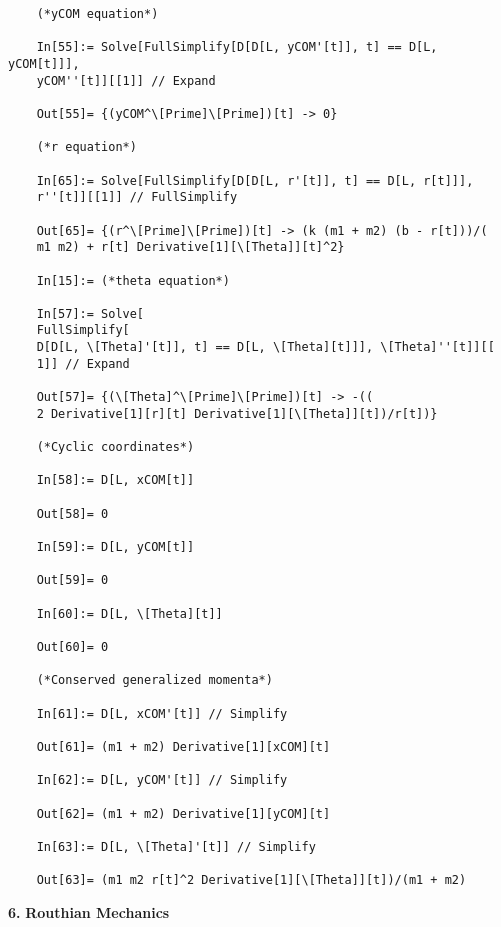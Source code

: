 \documentclass{article}
\theoremstyle{definition}
\begin{document}
\begin{enumerate}[label = (\alph*)]
\begin{lstlisting}
	(*yCOM equation*)
	
	In[55]:= Solve[FullSimplify[D[D[L, yCOM'[t]], t] == D[L, yCOM[t]]], 
	yCOM''[t]][[1]] // Expand
	
	Out[55]= {(yCOM^\[Prime]\[Prime])[t] -> 0}
	
	(*r equation*)
	
	In[65]:= Solve[FullSimplify[D[D[L, r'[t]], t] == D[L, r[t]]], 
	r''[t]][[1]] // FullSimplify
	
	Out[65]= {(r^\[Prime]\[Prime])[t] -> (k (m1 + m2) (b - r[t]))/(
	m1 m2) + r[t] Derivative[1][\[Theta]][t]^2}
	
	In[15]:= (*theta equation*)
	
	In[57]:= Solve[
	FullSimplify[
	D[D[L, \[Theta]'[t]], t] == D[L, \[Theta][t]]], \[Theta]''[t]][[
	1]] // Expand
	
	Out[57]= {(\[Theta]^\[Prime]\[Prime])[t] -> -((
	2 Derivative[1][r][t] Derivative[1][\[Theta]][t])/r[t])}
	
	(*Cyclic coordinates*)
	
	In[58]:= D[L, xCOM[t]]
	
	Out[58]= 0
	
	In[59]:= D[L, yCOM[t]]
	
	Out[59]= 0
	
	In[60]:= D[L, \[Theta][t]]
	
	Out[60]= 0
	
	(*Conserved generalized momenta*)
	
	In[61]:= D[L, xCOM'[t]] // Simplify
	
	Out[61]= (m1 + m2) Derivative[1][xCOM][t]
	
	In[62]:= D[L, yCOM'[t]] // Simplify
	
	Out[62]= (m1 + m2) Derivative[1][yCOM][t]
	
	In[63]:= D[L, \[Theta]'[t]] // Simplify
	
	Out[63]= (m1 m2 r[t]^2 Derivative[1][\[Theta]][t])/(m1 + m2)
	\end{lstlisting}
\end{enumerate}











\newpage
\noindent \textbf{6.} \textbf{Routhian Mechanics}\\
\end{document}
